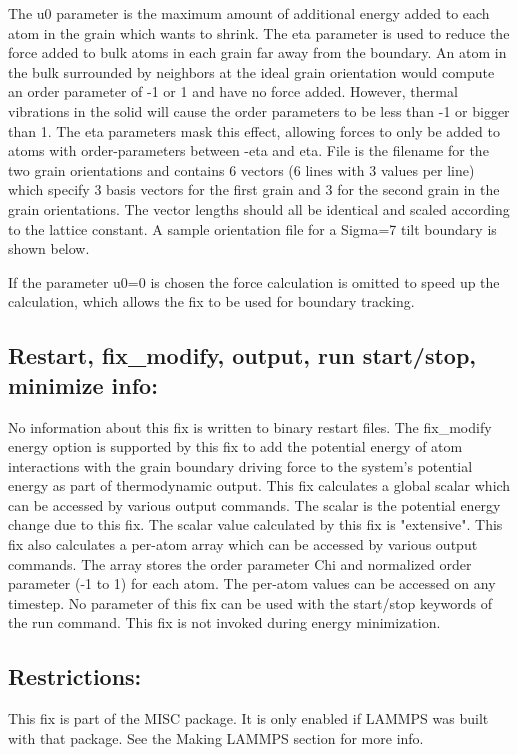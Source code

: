 \documentclass[11pt]{article}
\begin{document}
The u0 parameter is the maximum amount of additional energy added to each atom in the grain which wants to shrink.
The eta parameter is used to reduce the force added to bulk atoms in each grain far away from the boundary. An atom in the bulk surrounded by neighbors at the ideal grain orientation would compute an order parameter of -1 or 1 and have no force added. However, thermal vibrations in the solid will cause the order parameters to be less than -1 or bigger than 1. The eta parameters mask this effect, allowing forces to only be added to atoms with order-parameters between -eta and eta.
File is the filename for the two grain orientations and contains 6 vectors (6 lines with 3 values per line) which specify 3 basis vectors for the first grain and 3 for the second grain in the grain orientations. The vector lengths should all be identical and scaled according to the lattice constant. A sample orientation file for a Sigma=7 tilt boundary is shown below.

If the parameter u0=0 is chosen the force calculation is omitted to speed up the calculation, which allows the fix to be used for boundary tracking.

\subsection{Restart, fix\_modify, output, run start/stop, minimize info:}
No information about this fix is written to binary restart files.
The fix\_modify energy option is supported by this fix to add the potential energy of atom interactions with the grain boundary driving force to the system's potential energy as part of thermodynamic output.
This fix calculates a global scalar which can be accessed by various output commands. The scalar is the potential energy change due to this fix. The scalar value calculated by this fix is "extensive".
This fix also calculates a per-atom array which can be accessed by various output commands. The array stores the order parameter Chi and normalized order parameter (-1 to 1) for each atom. The per-atom values can be accessed on any timestep.
No parameter of this fix can be used with the start/stop keywords of the run command. This fix is not invoked during energy minimization.
\subsection{Restrictions:}
This fix is part of the MISC package. It is only enabled if LAMMPS was built with that package. See the Making LAMMPS section for more info.
\end{document}
